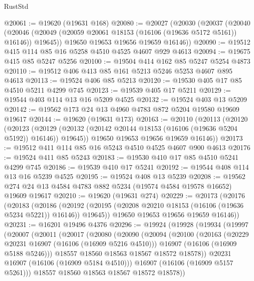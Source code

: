 \begin{lexlean}{RustStd}
\begin{coremodule}
@20061 := @19620 (@19631 @168)
@20080 := @20027
    (@20030
      (@20037
        (@20040
          (@20046 (@20049 (@20059 @20061 @18153 (@16106 (@19636 @5172 @5161)) @16146)) @19645))
        @19650
        @19653
        @19656
        @19659
        @16146))
@20090 := @19512 @415 @114 @85 @16 @5258 @4510 @4525 @4607 @929 @4613
@20094 := @19675 @415 @85 @5247 @5256
@20100 := @19504 @414 @162 @85 @5247 @5254 @4873
@20110 := @19512 @406 @413 @85 @161 @5213 @5246 @5253 @4607 @895 @4613
@20113 := @19524 @406 @85 @5213
@20120 := @19530 @405 @17 @85 @4510 @5211 @4299 @745
@20123 := @19539 @405 @17 @5211
@20129 := @19544 @403 @114 @13 @16 @5209 @4525
@20132 := @19524 @403 @13 @5209
@20142 := @19562 @173 @24 @13 @4960 @4783 @872 @5204 @19580 @19609 @19617
@20144 := @19620 (@19631 @173)
@20163 := @20110
    (@20113
      (@20120
        (@20123
          (@20129 (@20132 (@20142 @20144 @18153 (@16106 (@19636 @5204 @5192)) @16146)) @19645))
        @19650
        @19653
        @19656
        @19659
        @16146))
@20173 := @19512 @411 @114 @85 @16 @5243 @4510 @4525 @4607 @900 @4613
@20176 := @19524 @411 @85 @5243
@20183 := @19530 @410 @17 @85 @4510 @5241 @4299 @745
@20186 := @19539 @410 @17 @5241
@20192 := @19544 @408 @114 @13 @16 @5239 @4525
@20195 := @19524 @408 @13 @5239
@20208 := @19562 @274 @24 @13 @4584 @4783 @882 @5234 (@19574 @4584 @19578 @16652) @19609 @19617
@20210 := @19620 (@19631 @274)
@20229 := @20173
    (@20176
      (@20183
        (@20186
          (@20192 (@20195 (@20208 @20210 @18153 (@16106 (@19636 @5234 @5221)) @16146)) @19645))
        @19650
        @19653
        @19656
        @19659
        @16146))
@20231 := @16201 @19496 @4376
@20296 := @19924
    (@19928
      (@19934
        (@19997
          (@20007
            (@20011
              (@20017
                (@20080
                  (@20090
                    (@20094
                      (@20100
                        (@20163
                          (@20229 @20231 @16907 (@16106 (@16909 @5216 @4510)))
                          @16907
                          (@16106 (@16909 @5188 @5246)))
                        @18557
                        @18560
                        @18563
                        @18567
                        @18572
                        @18578))
                    @20231
                    @16907
                    (@16106 (@16909 @5184 @4510)))
                  @16907
                  (@16106 (@16909 @5157 @5261)))
                @18557
                @18560
                @18563
                @18567
                @18572
                @18578))

\end{coremodule}
\end{lexlean}
